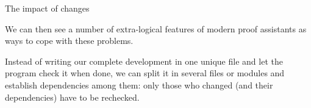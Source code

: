 \documentclass[ignorenonframetext,red]{beamer}
\begin{document}
\begin{frame}{The impact of changes}
\begin{center}
  \end{center}
  \pause
\end{frame}

We can then see a number of extra-logical features of modern proof
assistants as ways to cope with these problems. 

Instead of writing our complete development in one unique file and let
the program check it when done, we can split it in several files or
modules and establish dependencies among them: only those who changed
(and their dependencies) have to be rechecked.
\end{document}

